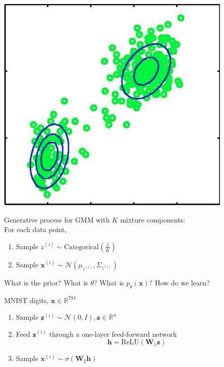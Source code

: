 \documentclass{beamer}
\newcommand{\zvec}{\mathbf{z}}
\newcommand{\xvec}{\mathbf{x}}
\newcommand{\reals}{\ensuremath{\mathbb{R}}}
\begin{document}
\begin{frame}
  \begin{center}
   \end{center}
   \center
\includegraphics[scale=0.5]{img/gmm2}
\end{frame}

\begin{frame}
  \begin{center}
   \end{center}   
 Generative process for GMM with $K$ mixture components: \\
 For each data point, 
 \begin{enumerate}
 \item Sample $z^{(i)} \sim \text{Categorical}(\frac{1}{K})$ 
 \item Sample $\xvec^{(i)} \sim \mathcal{N}(\mu_{z^{(i)}}, \Sigma_{z^{(i)}})$
 \end{enumerate}
 
 What is the prior? What is $\theta$? What is $p_\theta(\xvec)$? How do we learn?
\end{frame}

\begin{frame}
  \begin{center}
   \end{center}   
MNIST digits, $\xvec \in \reals^{784}$
 \begin{enumerate}
 \item Sample $\zvec^{(i)} \sim \mathcal{N}(0, I), \zvec \in \reals^n$ 
 \item Feed $\zvec^{(i)}$ through a one-layer feed-forward network
 \[ \mathbf{h} = \text{ReLU}(\mathbf{W}_1 \zvec)\]
 \item Sample $\xvec^{(i)} \sim \sigma(\mathbf{W}_2 \mathbf{h})$
 \end{enumerate}
\end{frame}
\end{document}
